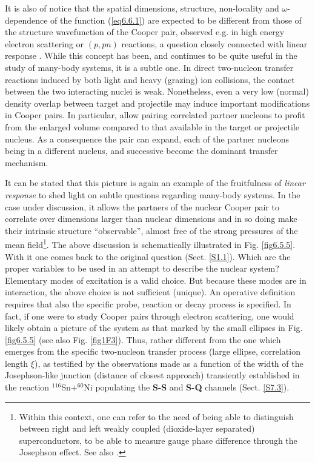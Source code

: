 It is also of notice that the spatial dimensions, structure, non-locality and $\omega$-dependence of the function (\ref{eq6.6.1}) are expected to be  different from those of the structure wavefunction of the Cooper pair, observed e.g. in high energy electron scattering or $(p,pn)$ reactions, a question closely connected with linear response . While this concept has been, and continues to be quite useful in the study of many-body systems, it is a subtle one. In direct two-nucleon transfer reactions induced by both light and heavy (grazing) ion  collisions, the contact between the two interacting nuclei is weak. Nonetheless, even a very low (normal) density overlap between target and projectile may induce important modifications in Cooper pairs. In particular, allow pairing correlated partner nucleons  to profit from the enlarged volume  compared to that available in the target or projectile nucleus. As a consequence the pair can  expand, each of the partner nucleons being in a different nucleus, and successive become the dominant transfer mechanism. 


It can be stated that this picture is again an example of the fruitfulness of \textit{linear response} to shed light on subtle questions regarding many-body systems. In the case under discussion, it allows the partners of the nuclear Cooper pair to correlate over dimensions larger than nuclear dimensions and in so doing make their intrinsic structure ``observable'', almost free of the strong pressures of the  mean field\footnote{Within this context, one can refer to  the need of being able to distinguish between   right and left weakly coupled (dioxide-layer separated) superconductors,  to be able to measure gauge phase difference through the Josephson effect. See also \cite{Magierski:17}.}. The above discussion is schematically illustrated in Fig. \ref{fig6.5.5}. With it one comes back to the original question (Sect. \ref{S1.1}). Which are the proper variables to be used in an attempt to describe the nuclear system? Elementary modes of excitation is a valid choice. But because these modes are in interaction, the above choice is not sufficient (unique). An operative definition requires that also the specific probe, reaction or decay process is specified. In fact, if one were to study Cooper pairs through electron scattering, one would likely obtain a picture of the system as that marked by the small ellipses in Fig. \ref{fig6.5.5} (see also Fig. \ref{fig1F3}). Thus, rather different from the one  which emerges from the specific two-nucleon transfer process (large ellipse, correlation length $\xi$), as testified by the observations made as a function of the width of the Josephson-like junction (distance of closest approach) transiently established in the reaction $^{116}$Sn+$^{60}$Ni populating the \textbf{S-S} and \textbf{S-Q} channels (Sect. \ref{S7.3}).  
